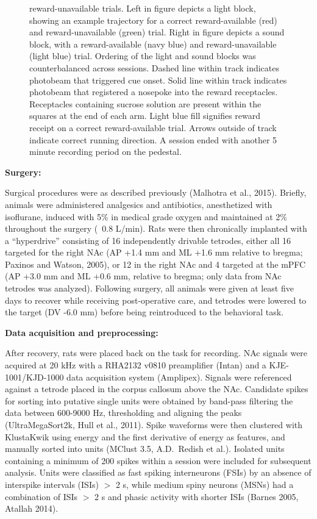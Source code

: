 \documentclass[11pt]{article}
\begin{document}
\begin{figure}[h]
{  reward-unavailable trials. Left in figure depicts a light block, showing an
  example trajectory for a correct reward-available (red) and reward-unavailable
  (green) trial. Right in figure depicts a sound block, with a reward-available
  (navy blue) and reward-unavailable (light blue) trial. Ordering of the light
  and sound blocks was counterbalanced across sessions. Dashed line within track
  indicates photobeam that triggered cue onset. Solid line within track
  indicates photobeam that registered a nosepoke into the reward
  receptacles. Receptacles containing sucrose solution are present within the
  squares at the end of each arm. Light blue fill signifies reward receipt on a
  correct reward-available trial. Arrows outside of track indicate correct
  running direction. A session ended with another 5 minute recording period on
  the pedestal.}
\label{fig:task}
\end{figure}

{\bf Surgery:} 

Surgical procedures were as described previously (Malhotra et al.,
2015). Briefly, animals were administered analgesics and antibiotics,
anesthetized with isoflurane, induced with 5\% in medical grade oxygen and
maintained at 2\% throughout the surgery (~0.8 L/min). Rats were then
chronically implanted with a ``hyperdrive'' consisting of 16 independently
drivable tetrodes, either all 16 targeted for the right NAc (AP +1.4 mm and ML
+1.6 mm relative to bregma; Paxinos and Watson, 2005), or 12 in the right NAc
and 4 targeted at the mPFC (AP +3.0 mm and ML +0.6 mm, relative to bregma; only
data from NAc tetrodes was analyzed). Following surgery, all animals were given
at least five days to recover while receiving post-operative care, and tetrodes
were lowered to the target (DV -6.0 mm) before being reintroduced to the
behavioral task.

{\bf Data acquisition and preprocessing:}

After recovery, rats were placed back on the task for recording. NAc signals
were acquired at 20 kHz with a RHA2132 v0810 preamplifier (Intan) and a
KJE-1001/KJD-1000 data acquisition system (Amplipex). Signals were referenced
against a tetrode placed in the corpus callosum above the NAc. Candidate spikes
for sorting into putative single units were obtained by band-pass filtering the
data between 600-9000 Hz, thresholding and aligning the peaks (UltraMegaSort2k,
Hull et al., 2011). Spike waveforms were then clustered with KlustaKwik using
energy and the first derivative of energy as features, and manually sorted into
units (MClust 3.5, A.D.\ Redish et al.). Isolated units containing a minimum of
200 spikes within a session were included for subsequent analysis. Units were
classified as fast spiking interneurons (FSIs) by an absence of interspike
intervals (ISIs) $>$ 2 s, while medium spiny neurons (MSNs) had a combination of
ISIs $>$ 2 s and phasic activity with shorter ISIs (Barnes 2005, Atallah 2014).
\end{document}

